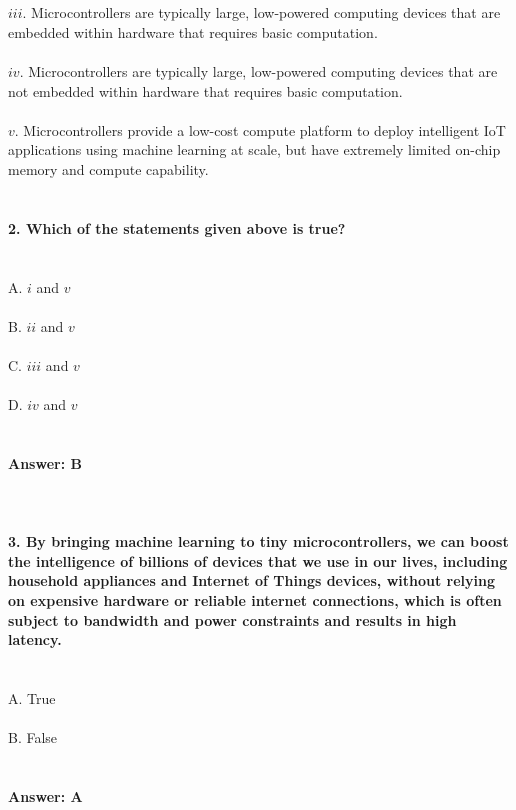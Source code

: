 \documentclass[prl,twocolumn,showpacs,preprintnumbers,superscriptaddress]{revtex4}
\theoremstyle{plain}
\theoremstyle{definition}
\begin{document}
\begin{widetext}
\\
\\
$iii$. Microcontrollers are typically large, low-powered computing devices that are embedded within hardware that requires basic computation.
\\
\\
$iv$. Microcontrollers are typically large, low-powered computing devices that are not embedded within hardware that requires basic computation.
\\
\\
$v.$ Microcontrollers provide a low-cost compute platform to deploy intelligent IoT applications using machine learning at scale, but have
extremely limited on-chip memory and compute capability.
\\
\\
\\
\textbf{2. Which of the statements given above is true?}
\\
\\
\\
A. $i$ and $v$
\\
\\
B. $ii$ and $v$
\\
\\
C. $iii$ and $v$
\\
\\
D. $iv$ and $v$
\\
\\
\\
\textbf{Answer: B}
\\
\\
\\
\\
\textbf{3. By bringing machine learning to tiny microcontrollers, we can boost the intelligence of billions of devices that we use in our lives, including household appliances and Internet of Things devices, without relying on expensive hardware or reliable internet connections, which is often subject to bandwidth and power constraints and results in high latency.}
\\
\\
\\
A. True
\\
\\
B. False
\\
\\
\\
\textbf{Answer: A}
\\
\\
\\
\\

\end{widetext}
\end{document}
